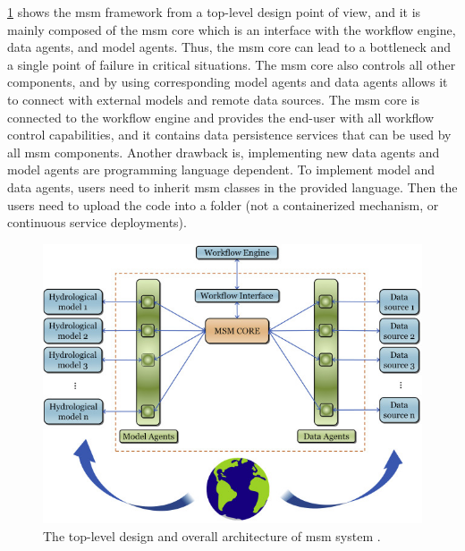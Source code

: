 \cref{fi:msm_architecture} shows the \acrshort{msm} framework from a top-level design point of view, and it is mainly composed of the \acrshort{msm} core which is an interface with the workflow engine, data agents, and model agents. Thus, the \acrshort{msm} core can lead to a bottleneck and a single point of failure in critical situations. The \acrshort{msm} core also controls all other components, and by using corresponding model agents and data agents allows it to connect with external models and remote data sources. The \acrshort{msm} core is connected to the workflow engine and provides the end-user with all workflow control capabilities, and it contains data persistence services that can be used by all \acrshort{msm} components. Another drawback is, implementing new data agents and model agents are programming language dependent. To implement model and data agents, users need to inherit \acrshort{msm} classes in the provided language. Then the users need to upload the code into a folder (not a containerized mechanism, or continuous service deployments).

\begin{figure}[htp]
    \centering
    \includegraphics[width=1\textwidth]{lit/other/msm_architecture.jpg}
    \caption[The top-level design and overall architecture of \acrshort{msm} system]{The top-level design and overall architecture of \acrshort{msm} system \cite{Salas2020AnApplication}.}
    \label{fi:msm_architecture}
\end{figure}

